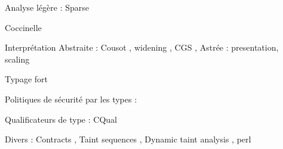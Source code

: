 Analyse légère : Sparse \cite{TorvaldsSparse}

Coccinelle \cite{coccinelle09} \cite{coccinelle11} 

Interprétation Abstraite : Cousot \cite{Cousot77,Cousot92-1},
    widening \cite{granger},
    CGS \cite{cgs},
    Astrée : presentation\cite{Astree04,Astree05}, scaling \cite{AstreeScale}

Typage fort \cite{TAPL}

Politiques de sécurité par les types : \cite{lightweight-static-capabilities,LZ06a}

Qualificateurs de type : CQual \cite{pldi99,usenix01,pldi02,cquk-usenix04,toplas-quals}

Divers : Contracts \cite{cssv}, Taint sequences \cite{mdv10}, Dynamic taint analysis \cite{oakland10}, perl
